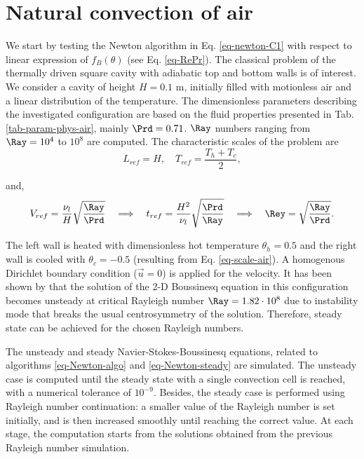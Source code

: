 
\section{Natural convection of air}\label{sec: natconv-air-2D}
We start by testing the Newton algorithm in Eq. \ref{eq-newton-C1} with respect to linear expression of $f_B(\theta)$  (see Eq. \ref{eq-RePr}). %
The classical problem of the thermally driven square cavity with adiabatic top and bottom walls is of interest.
We consider a cavity of height $H = 0.1$ m, initially filled with motionless air and a linear distribution of the temperature. 
The dimensionless parameters describing the investigated configuration are based on the fluid properties presented in Tab. \ref{tab-param-phys-air}, mainly $\Prd = 0.71$.
$\Ray$ numbers ranging from $\Ray = 10^4$ to $10^8$ are computed. 
The characteristic scales of the problem are 
\begin{equation} \label{eq-scale-air}
	L_{ref} = H, \quad T_{ref} = \frac{T_h + T_c}{2},
\end{equation}

\noindent and,
\begin{equation} \label{eq-scaling-3}
   V_{ref} = \frac{\nu_l}{H} \sqrt{\frac{\Ray}{\Prd}} 
   \quad \Longrightarrow \quad t_{ref} = \frac{H^2}{\nu_l} \sqrt{\frac{\Prd}{\Ray}} 
   \quad \Longrightarrow \quad \Rey = \sqrt{\frac{\Ray}{\Prd}}.
\end{equation} 

\noindent The left wall is heated with dimensionless hot temperature $\theta_h = 0.5$ and the right wall is cooled with $\theta_c = -0.5$ (resulting from Eq. \ref{eq-scale-air}). 
A homogenous Dirichlet boundary condition ($\vec u = 0$) is applied for the velocity.
It has been shown by \cite{le1998onset} that the solution of the 2-D Boussinesq equation in this configuration becomes unsteady at critical Rayleigh number $\Ray= 1.82 \cdot 10^{8}$ due to instability mode that breaks the usual centrosymmetry of the solution.
Therefore, steady state can be achieved for the chosen Rayleigh numbers.

The unsteady  and steady Navier-Stokes-Boussinesq equations, related to algorithms \ref{eq-Newton-algo} and \ref{eq-Newton-steady} are simulated.
The unsteady case is computed until the steady state with a single convection cell is reached, with a numerical tolerance of $10^{-9}$.
Besides, the steady case is performed using Rayleigh number continuation:
a smaller value of the Rayleigh number is set initially, and is then increased smoothly until reaching the correct value.
At each stage, the computation starts from the solutions obtained from the previous Rayleigh number simulation.

